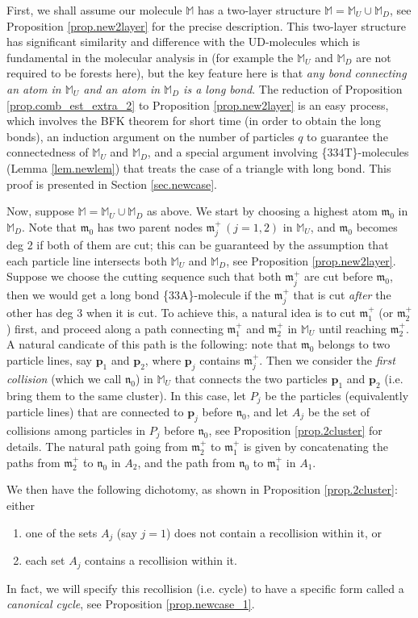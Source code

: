 \documentclass[10pt, reqno]{amsart}
\newcommand{\pb}{{\boldsymbol{p}}}
\newcommand{\Mb}{\mathbb M}
\newcommand{\mf}{\mathfrak m}
\newcommand{\nf}{\mathfrak n}
\theoremstyle{definition}
\theoremstyle{remark}
\numberwithin{equation}{section}
\begin{document}
\smallskip
First, we shall assume our molecule $\Mb$ has a two-layer structure $\Mb=\Mb_U\cup\Mb_D$, see Proposition \ref{prop.new2layer} for the precise description. This two-layer structure has significant similarity and difference with the UD-molecules which is fundamental in the molecular analysis in \cite{DHM24} (for example the $\Mb_U$ and $\Mb_D$ are not required to be forests here), but the key feature here is that \emph{any bond connecting an atom in $\Mb_U$ and an atom in $\Mb_D$ is a long bond}. The reduction of Proposition \ref{prop.comb_est_extra_2} to Proposition \ref{prop.new2layer} is an easy process, which involves the BFK theorem for short time (in order to obtain the long bonds), an induction argument on the number of particles $q$ to guarantee the connectedness of $\Mb_U$ and $\Mb_D$, and a special argument involving \{334T\}-molecules (Lemma \ref{lem.newlem}) that treats the case of a triangle with long bond. This proof is presented in Section \ref{sec.newcase}.

\smallskip
Now, suppose $\Mb=\Mb_U\cup\Mb_D$ as above. We start by choosing a highest atom $\mf_0$ in $\Mb_D$. Note that $\mf_0$ has two parent nodes $\mf_j^+\,(j=1,2)$ in $\Mb_U$, and $\mf_0$ becomes deg 2 if both of them are cut; this can be guaranteed by the assumption that each particle line intersects both $\Mb_U$ and $\Mb_D$, see Proposition \ref{prop.new2layer}. Suppose we choose the cutting sequence such that both $\mf_j^+$ are cut before $\mf_0$, then we would get a long bond \{33A\}-molecule if the $\mf_j^+$ that is cut \emph{after} the other has deg 3 when it is cut. To achieve this, a natural idea is to cut $\mf_1^+$ (or $\mf_2^+$) first, and proceed along a path connecting $\mf_1^+$ and $\mf_2^+$ in $\Mb_U$  until reaching $\mf_2^+$. A natural candicate of this path is the following: note that $\mf_0$ belongs to two particle lines, say $\pb_1$ and $\pb_2$, where $\pb_j$ contains $\mf_j^+$. Then we  consider the \emph{first collision} (which we call $\nf_0$) in $\Mb_U$ that connects the two particles $\pb_1$ and $\pb_2$ (i.e. bring them to the same cluster). In this case, let $P_j$ be the particles (equivalently particle lines) that are connected to $\pb_j$ before $\nf_0$, and let $A_j$ be the set of collisions among particles in $P_j$ before $\nf_0$, see Proposition \ref{prop.2cluster} for details. The natural path going from $\mf_2^+$ to $\mf_1^+$ is given by concatenating the paths from $\mf_2^+$ to $\nf_0$ in $A_2$, and the path from $\nf_0$ to $\mf_1^+$ in $A_1$.

We then have the following dichotomy, as shown in Proposition \ref{prop.2cluster}: either
\begin{enumerate}[{(i)}]
\item one of the sets $A_j$ (say $j=1$) does not contain a recollision within it, or
\item each set $A_j$ contains a recollision within it.
\end{enumerate}
In fact, we will specify this recollision (i.e. cycle) to have a specific form called a \emph{canonical cycle}, see Proposition \ref{prop.newcase_1}.
\end{document}
